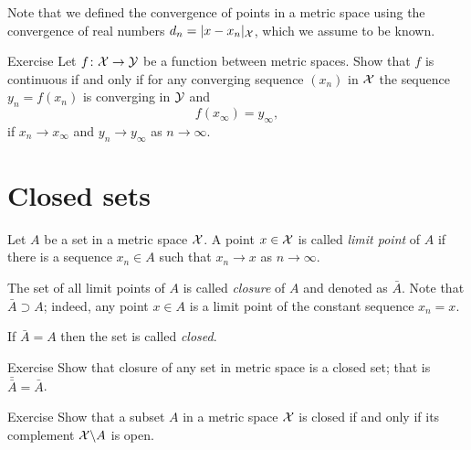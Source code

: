Note that we defined the convergence of points in a metric space using the convergence of real numbers $d_n=|x-x_n|_{\mathcal{X}}$, which we assume to be known.

\begin{thm}{Exercise}
Let $f\colon\mathcal{X}\to\mathcal{Y}$ be a function between metric spaces.
Show that $f$ is continuous if and only if for any converging sequence $(x_n)$ in $\mathcal{X}$ the sequence $y_n=f(x_n)$ is converging in $\mathcal{Y}$ and 
\[f( x_\infty)= y_\infty,\]
if
$x_n\to x_\infty$ and $y_n\to y_\infty$ as $n\to\infty$.

\end{thm}


\section{Closed sets}

Let $A$ be a set in a metric space $\mathcal{X}$.
A point $x\in \mathcal{X}$ is called \emph{limit point} of $A$ if there is a sequence $x_n\in A$ such that $x_n\to x$ as $n\to\infty$.

The set of all limit points of $A$ is called \emph{closure} of $A$ and denoted as $\bar A$.
Note that $\bar A\supset A$;
indeed, any point $x\in A$ is a limit point of the constant sequence $x_n=x$.

If $\bar A= A$ then the set is called \emph{closed}.

\begin{thm}{Exercise}
Show that closure of any set in metric space is a closed set; that is $\bar{\bar A}= \bar A$.
\end{thm}

\begin{thm}{Exercise}
Show that a subset $A$ in a metric space $\mathcal{X}$ is closed if and only if its complement $\mathcal{X}\backslash A$ is open.
\end{thm}



